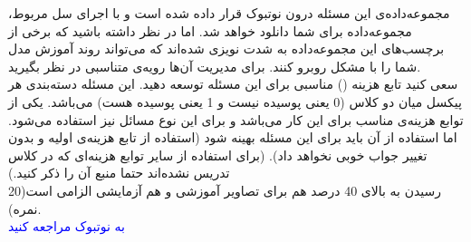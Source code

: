 \documentclass[12pt]{article}
\begin{document}
\begin{enumerate}
    مجموعه‌داده‌ی این مسئله درون نوتبوک قرار داده شده است و با اجرای سل مربوط، مجموعه‌داده برای شما دانلود خواهد شد. اما در نظر داشته باشید که برخی از برچسب‌های این مجموعه‌داده به شدت نویزی شده‌اند که می‌تواند روند آموزش مدل شما را با مشکل روبرو کنند. برای مدیریت آن‌ها رویه‌ی متناسبی در نظر بگیرید.\\

    سعی کنید تابع هزینه () مناسبی برای این مسئله توسعه دهید. این مسئله دسته‌بندی هر پیکسل میان دو کلاس (0 یعنی پوسیده نیست و 1 یعنی پوسیده هست) می‌باشد. یکی از توابع هزینه‌ی مناسب برای این کار  می‌باشد و برای این نوع مسائل نیز استفاده می‌شود. اما استفاده از آن باید برای این مسئله بهینه شود (استفاده از تابع هزینه‌ی  اولیه و بدون تغییر جواب خوبی نخواهد داد). (برای استفاده از سایر توابع هزینه‌ای که در کلاس تدریس نشده‌اند حتما منبع آن را ذکر کنید.)\\

    رسیدن به \href{https://oecd.ai/en/catalogue/metrics/dice-score#:~:text=The%20Dice%20score%20ranges%20from,of%20elements%20in%20set%20B)}{\lr{dice score}} بالای 40 درصد هم برای تصاویر آموزشی و هم آزمایشی الزامی است(20 نمره).\\
    \textcolor{blue}{
    به نوتبوک  مراجعه کنید
    }

    

\end{enumerate}
\end{document}
